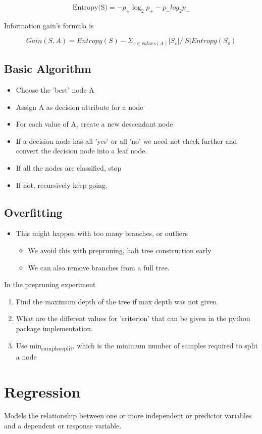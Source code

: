 \documentclass[11pt]{article}
\begin{document}
$$\text{Entropy(S)} = -p_+ \log_2p_+ - p_- log_2p_{-}$$

Information gain's formula is

$$Gain(S,A) = Entropy(S) - \Sigma_{v \in values(A)} |S_v| / |S| Entropy(S_v)$$
\subsection{Basic Algorithm}
\label{sec:org1185b82}
\begin{itemize}
\item Choose the 'best' node A
\item Assign A as decision attribute for a node
\item For each value of A, create a new descendant node
\item If a decision node has all 'yes' or all 'no' we need not check further and convert the decision node into a leaf node.
\item If all the nodes are classified, stop
\item If not, recursively keep going.
\end{itemize}
\subsection{Overfitting}
\label{sec:org4327526}
\begin{itemize}
\item This might happen with too many branches, or outliers
\begin{itemize}
\item We avoid this with prepruning, halt tree construction early
\item We can also remove branches from a full tree.
\end{itemize}
\end{itemize}

In the prepruning experiment
\begin{enumerate}
\item Find the maximum depth of the tree if max depth was not given.
\item What are the different values for 'criterion' that can be given in the python package implementation.
\item Use min\textsubscript{samples}\textsubscript{split}, which is the minimum number of samples required to split a node
\end{enumerate}
\section{Regression}
\label{sec:org341b9fa}
Models the relationship between one or more independent or predictor variables and a dependent or response variable.
\end{document}
